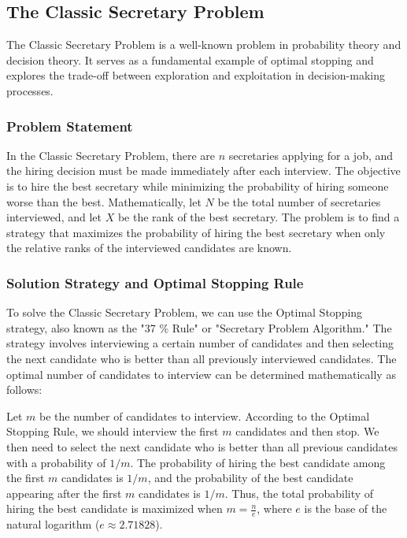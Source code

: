 \documentclass[12pt]{book} %
\begin{document}
\subsection{The Classic Secretary Problem}
The Classic Secretary Problem is a well-known problem in probability theory and decision theory. It serves as a fundamental example of optimal stopping and explores the trade-off between exploration and exploitation in decision-making processes.

\subsubsection{Problem Statement}
In the Classic Secretary Problem, there are \(n\) secretaries applying for a job, and the hiring decision must be made immediately after each interview. The objective is to hire the best secretary while minimizing the probability of hiring someone worse than the best. Mathematically, let \(N\) be the total number of secretaries interviewed, and let \(X\) be the rank of the best secretary. The problem is to find a strategy that maximizes the probability of hiring the best secretary when only the relative ranks of the interviewed candidates are known.

\subsubsection{Solution Strategy and Optimal Stopping Rule}
To solve the Classic Secretary Problem, we can use the Optimal Stopping strategy, also known as the "37 \% Rule" or "Secretary Problem Algorithm." The strategy involves interviewing a certain number of candidates and then selecting the next candidate who is better than all previously interviewed candidates. The optimal number of candidates to interview can be determined mathematically as follows:

Let \(m\) be the number of candidates to interview. According to the Optimal Stopping Rule, we should interview the first \(m\) candidates and then stop. We then need to select the next candidate who is better than all previous candidates with a probability of \(1/m\). The probability of hiring the best candidate among the first \(m\) candidates is \(1/m\), and the probability of the best candidate appearing after the first \(m\) candidates is \(1/m\). Thus, the total probability of hiring the best candidate is maximized when \(m = \frac{n}{e}\), where \(e\) is the base of the natural logarithm (\(e \approx 2.71828\)). 
\end{document}

